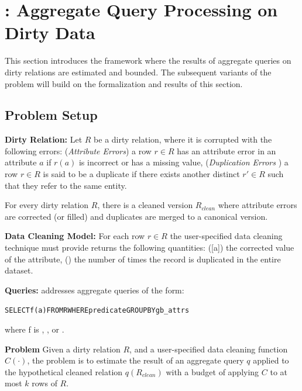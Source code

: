\section{\sampleclean: Aggregate Query Processing on Dirty Data}
This section introduces the \sampleclean framework where the results of aggregate queries on dirty relations are estimated and bounded. The subsequent variants of the problem will build on the formalization and results of this section.

\subsection{Problem Setup}

\noindent \textbf{Dirty Relation: } Let $R$ be a dirty relation, where it is corrupted with the following errors: (\emph{Attribute Errors}) a row $r\in R$ has an attribute error in an attribute $a$ if $r(a)$ is incorrect or has a missing value,  (\emph{Duplication Errors} ) a row $r \in R$ is said to be a duplicate if there exists another distinct $r' \in R$ such that they refer to the same entity.

\vspace{.25em}

\noindent For every dirty relation $R$, there is a cleaned version $R_{clean}$ where attribute errors are corrected (or filled) and duplicates are merged to a canonical version. 

\vspace{.25em}

\noindent\textbf{Data Cleaning Model: } 
For each row $r \in R$ the user-specified data cleaning technique must provide returns the following quantities: ([a]) the corrected value of the attribute, () the number of times the record is duplicated in the entire dataset.

\vspace{.25em}

\noindent\textbf{Queries: } \sampleclean addresses aggregate queries of the form:
\begin{alltt}
SELECT \textsf{f}(a) FROM R WHERE predicate GROUP BY gb_attrs
\end{alltt}
where f is \avgfunc, \sumfunc, or \countfunc. 

\vspace{.25em}

\noindent\textbf{\sampleclean Problem}
Given a dirty relation $R$, and a user-specified data cleaning function $C(\cdot)$, the \sampleclean problem is to estimate the result of an aggregate query $q$ applied to the hypothetical cleaned relation $q(R_{clean})$ with a budget of applying $C$ to at most $k$ rows of $R$. 

